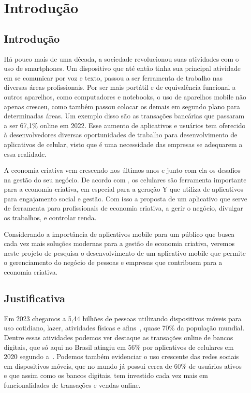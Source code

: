 \chapter{Introdução}\label{ch:introducao}
\section{Introdução}

Há pouco mais de uma década, a sociedade revolucionou suas atividades com o uso de smartphones.
Um dispositivo que até então tinha sua principal atividade em se comunicar por voz e texto, passou a ser ferramenta de trabalho nas diversas áreas profissionais.
Por ser mais portátil e de equivalência funcional a outros aparelhos, como computadores e notebooks, o uso de aparelhos mobile não apenas cresceu, como também passou colocar os demais em segundo plano para determinadas áreas.
Um exemplo disso são as transações bancárias que passaram a ser 67,1\% online em 2022\cite{bebraban2022}.
Esse aumento de aplicativos e usuários tem oferecido à desenvolvedores diversas oportunidades de trabalho para desenvolvimento de aplicativos de celular, visto que é uma necessidade das empresas se adequarem a essa realidade.

A economia criativa vem crescendo nos últimos anos e junto com ela os desafios na gestão do seu negócio.
De acordo com , os celulares são ferramenta importante para a economia criativa, em especial para a geração Y que utiliza de aplicativos para engajamento social e gestão.
Com isso a proposta de um aplicativo que serve de ferramenta para profissionais de economia criativa, a gerir o negócio, divulgar os trabalhos, e controlar renda.

Considerando a importância de aplicativos mobile para um público que busca cada vez mais soluções modernas para a gestão de economia criativa, veremos neste projeto de pesquisa o desenvolvimento de um aplicativo mobile que permite o gerenciamento do negócio de pessoas e empresas que contribuem para a economia criativa.

\section{Justificativa}\label{sec:justificativa}

Em 2023 chegamos a 5,44 bilhões de pessoas utilizando dispositivos móveis para uso cotidiano, lazer, atividades físicas e afins~\cite{wearesocial}, quase 70\% da população mundial.
Dentre essas atividades podemos ver destaque as transações online de bancos digitais, que só aqui no Brasil atingiu em 56\% por aplicativos de celulares em 2020 segundo a~.
Podemos também evidenciar o uso crescente das redes sociais em dispositivos móveis, que no mundo já possui cerca de 60\% de usuários ativos~\cite{wearesocial} e que assim como os bancos digitais, tem investido cada vez mais em funcionalidades de transações e vendas online.

